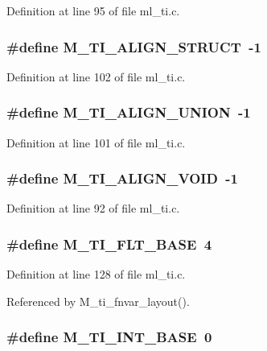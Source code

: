 Definition at line 95 of file ml\_\-ti.c.
\subsubsection{\setlength{\rightskip}{0pt plus 5cm}\#define M\_\-TI\_\-ALIGN\_\-STRUCT~-1}\label{ml__ti_8c_add91d4370032f4630acf8d95f2192eb}




Definition at line 102 of file ml\_\-ti.c.
\subsubsection{\setlength{\rightskip}{0pt plus 5cm}\#define M\_\-TI\_\-ALIGN\_\-UNION~-1}\label{ml__ti_8c_72ea3c60f3363eeef12bb26d96e78a26}




Definition at line 101 of file ml\_\-ti.c.
\subsubsection{\setlength{\rightskip}{0pt plus 5cm}\#define M\_\-TI\_\-ALIGN\_\-VOID~-1}\label{ml__ti_8c_55c9385ed967b337ab735f73000278ba}




Definition at line 92 of file ml\_\-ti.c.
\subsubsection{\setlength{\rightskip}{0pt plus 5cm}\#define M\_\-TI\_\-FLT\_\-BASE~4}\label{ml__ti_8c_53e15df461654a155706bdfd14f50e95}




Definition at line 128 of file ml\_\-ti.c.

Referenced by M\_\-ti\_\-fnvar\_\-layout().
\subsubsection{\setlength{\rightskip}{0pt plus 5cm}\#define M\_\-TI\_\-INT\_\-BASE~0}\label{ml__ti_8c_d5c7e3aae36fa5409778a6da6544db0e}




